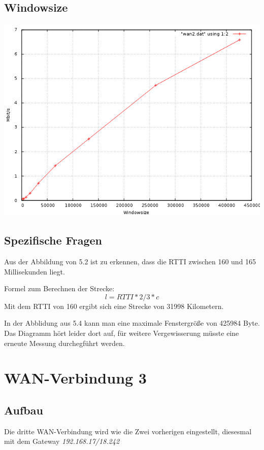 \documentclass[a4paper,10pt]{article}
\begin{document}
\subsection{Windowsize}
\includegraphics[scale=0.75]{wan2_windows.png}

\subsection{Spezifische Fragen}
\begin{itemize}
 \item Aus der Abbildung von 5.2 ist zu erkennen, dass die RTTI zwischen 160 und 165 Millisekunden liegt.
 \item {Formel zum Berechnen der Strecke: 
 \begin{equation}
  l=RTTI*2/3*c
 \end{equation}
 Mit dem RTTI von 160 ergibt sich eine Strecke von 31998 Kilometern.
 \item In der Abblidung aus 5.4 kann man eine maximale Fenstergröße von 425984 Byte. Das Diagramm hört leider dort auf, 
 für weitere Vergewisserung müsste eine erneute Messung durchegführt werden.}
\end{itemize}

\section{WAN-Verbindung 3}

\subsection{Aufbau}
Die dritte WAN-Verbindung wird wie die Zwei vorherigen eingestellt, diesesmal mit dem Gateway \textit{192.168.17/18.242}
\end{document}
